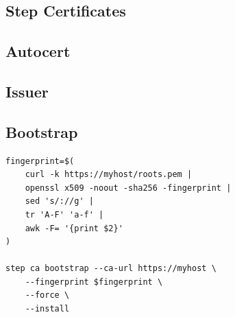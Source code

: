 \subsection{Step Certificates}

\subsection{Autocert}

\subsection{Issuer}

\subsection{Bootstrap}

\begin{verbatim}
fingerprint=$(
    curl -k https://myhost/roots.pem | 
    openssl x509 -noout -sha256 -fingerprint | 
    sed 's/://g' | 
    tr 'A-F' 'a-f' | 
    awk -F= '{print $2}'
)

step ca bootstrap --ca-url https://myhost \
    --fingerprint $fingerprint \
    --force \
    --install
\end{verbatim}






